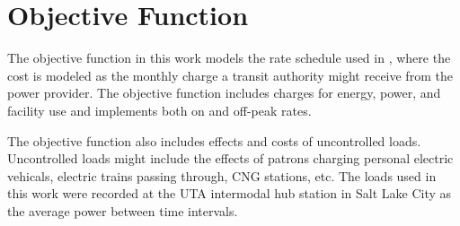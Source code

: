 \section{Objective Function}
The objective function in this work models the rate schedule used in \cite{noauthor_rocky_nodate}, where the cost is modeled as the monthly charge a transit authority might receive from the power provider. The objective function includes charges for energy, power, and facility use and implements both on and off-peak rates.
\par The objective function also includes effects and costs of uncontrolled loads. Uncontrolled loads might include the effects of patrons charging personal electric vehicals, electric trains passing through, CNG stations, etc. The loads used in this work were recorded at the UTA intermodal hub station in Salt Lake City as the average power between time intervals. 
